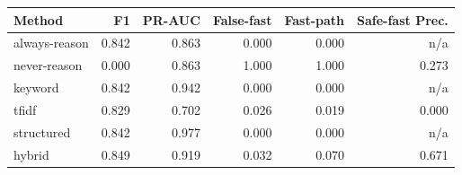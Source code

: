 \begin{tabular}{lrrrrr}
\toprule
Method & F1 & PR-AUC & False-fast & Fast-path & Safe-fast Prec. \\
\midrule
always-reason & 0.842 & 0.863 & 0.000 & 0.000 & n/a \\
never-reason & 0.000 & 0.863 & 1.000 & 1.000 & 0.273 \\
keyword & 0.842 & 0.942 & 0.000 & 0.000 & n/a \\
tfidf & 0.829 & 0.702 & 0.026 & 0.019 & 0.000 \\
structured & 0.842 & 0.977 & 0.000 & 0.000 & n/a \\
hybrid & 0.849 & 0.919 & 0.032 & 0.070 & 0.671 \\
\bottomrule
\end{tabular}

